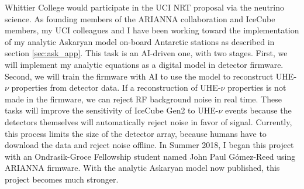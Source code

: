 \documentclass[../../../main.tex]{subfiles}
\begin{document}
Whittier College would participate in the UCI NRT proposal via the neutrino science.  As founding members of the ARIANNA collaboration \cite{Barwick:2014pca,barwick2016radio,10.1109/tns.2015.2468182,4_5} and IceCube members, my UCI colleagues and I have been working toward the implementation of my analytic Askaryan model on-board Antarctic stations as described in section \ref{sec:ask_app}.  This task is an AI-driven one, with two stages.  First, we will implement my analytic equations as a digital model in detector firmware.  Second, we will train the firmware with AI to use the model to reconstruct UHE-$\nu$ properties from detector data.  If a reconstruction of UHE-$\nu$ properties is not made in the firmware, we can reject RF background noise in real time.  These tasks will improve the sensitivity of IceCube Gen2 to UHE-$\nu$ events because the detectors themselves will automatically reject noise in favor of signal.  Currently, this process limits the size of the detector array, because humans have to download the data and reject noise offline.  In Summer 2018, I began this project with an Ondrasik-Groce Fellowship student named John Paul G\'{o}mez-Reed using ARIANNA firmware.  With the analytic Askaryan model now published, this project becomes much stronger.
\end{document}

